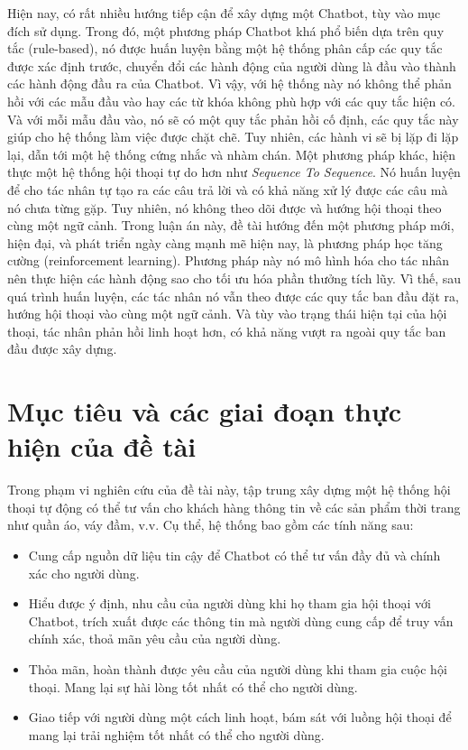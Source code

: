 Hiện nay, có rất nhiều hướng tiếp cận để xây dựng một Chatbot,
tùy vào mục đích sử dụng. Trong đó, một phương pháp Chatbot khá
phổ biến dựa trên quy tắc (rule-based), nó được huấn luyện bằng
một hệ thống phân cấp các quy tắc được xác định trước, chuyển đổi
các hành động của người dùng là đầu vào thành các hành động đầu ra
của Chatbot. Vì vậy, với hệ thống này nó không thể phản hồi với
các mẫu đầu vào hay các từ khóa không phù hợp với các quy tắc
hiện có. Và với mỗi mẫu đầu vào, nó sẽ có một quy tắc phản hồi
cố định, các quy tắc này giúp cho hệ thống làm việc được chặt chẽ.
Tuy nhiên, các hành vi sẽ bị lặp đi lặp lại, dẫn tới một hệ thống
cứng nhắc và nhàm chán. Một phương pháp khác, hiện thực một hệ thống
hội thoại tự do hơn như \textit{Sequence To Sequence}. Nó huấn luyện
để cho tác nhân tự tạo ra các câu trả lời và có khả năng xử lý được
các câu mà nó chưa từng gặp. Tuy nhiên, nó không theo dõi được và
hướng hội thoại theo cùng một ngữ cảnh. Trong luận án này, đề tài
hướng đến một phương pháp mới, hiện đại, và phát triển ngày càng
mạnh mẽ hiện nay, là phương pháp học tăng cường (reinforcement learning).
Phương pháp này nó mô hình hóa cho tác nhân nên thực hiện các hành động
sao cho tối ưu hóa phần thưởng tích lũy. Vì thế, sau quá trình huấn luyện,
các tác nhân nó vẫn theo được các quy tắc ban đầu đặt ra, hướng hội thoại
vào cùng một ngữ cảnh. Và tùy vào trạng thái hiện tại của hội thoại,
tác nhân phản hồi linh hoạt hơn, có khả năng vượt ra ngoài quy tắc
ban đầu được xây dựng.

\section{Mục tiêu và các giai đoạn thực hiện của đề tài}
\label{sec:muctieu}
Trong phạm vi nghiên cứu của đề tài này, tập trung xây dựng một
hệ thống hội thoại tự động có thể tư vấn cho khách hàng thông tin
về các sản phẩm thời trang như quần áo, váy đầm, v.v. Cụ thể,
hệ thống bao gồm các tính năng sau:

\begin{itemize}
    \item Cung cấp nguồn dữ liệu tin cậy để Chatbot có thể tư vấn
    đầy đủ và chính xác cho người dùng.
    \item Hiểu được ý định, nhu cầu của người dùng khi họ tham gia
    hội thoại với Chatbot, trích xuất được các thông tin mà người dùng
    cung cấp để truy vấn chính xác, thoả mãn yêu cầu của người dùng.
    \item Thỏa mãn, hoàn thành được yêu cầu của người dùng khi
    tham gia cuộc hội thoại. Mang lại sự hài lòng tốt nhất
    có thể cho người dùng.
    \item Giao tiếp với người dùng một cách linh hoạt, bám sát với
    luồng hội thoại để mang lại trải nghiệm tốt nhất
    có thể cho người dùng.
\end{itemize}

